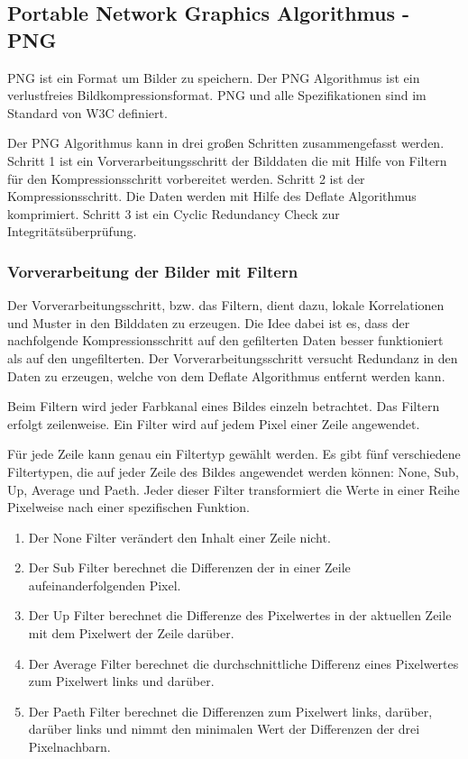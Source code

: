 \documentclass[conference]{IEEEtran}
\begin{document}
\subsection{Portable Network Graphics Algorithmus - PNG}

PNG ist ein Format um Bilder zu speichern.
Der PNG Algorithmus ist ein verlustfreies Bildkompressionsformat. 
PNG und alle Spezifikationen sind im Standard von W3C definiert. \cite{w3c}

Der PNG Algorithmus kann in drei großen Schritten zusammengefasst werden.
Schritt 1 ist ein Vorverarbeitungsschritt der Bilddaten die mit Hilfe von 
Filtern für den Kompressionsschritt vorbereitet werden.
Schritt 2 ist der Kompressionsschritt. 
Die Daten werden mit Hilfe des Deflate Algorithmus komprimiert.
Schritt 3 ist ein Cyclic Redundancy Check zur Integritätsüberprüfung.


\subsubsection{Vorverarbeitung der Bilder mit Filtern}

Der Vorverarbeitungsschritt, bzw. das Filtern, dient dazu, lokale Korrelationen und 
Muster in den Bilddaten zu erzeugen.
Die Idee dabei ist es, dass der nachfolgende Kompressionsschritt
auf den gefilterten Daten besser funktioniert als auf den ungefilterten.
Der Vorverarbeitungsschritt versucht Redundanz in den Daten zu erzeugen, welche 
von dem Deflate Algorithmus entfernt werden kann. 

Beim Filtern wird jeder Farbkanal eines Bildes einzeln betrachtet. 
Das Filtern erfolgt zeilenweise. 
Ein Filter wird auf jedem Pixel einer Zeile angewendet.

Für jede Zeile kann genau ein Filtertyp gewählt werden. 
Es gibt fünf verschiedene Filtertypen, die auf jeder Zeile 
des Bildes angewendet werden können: None, Sub, Up, Average und Paeth. 
Jeder dieser Filter transformiert die Werte in einer Reihe Pixelweise nach einer spezifischen
Funktion.

\begin{enumerate}
  \item Der None Filter verändert den Inhalt einer Zeile nicht.
  \item Der Sub Filter berechnet die Differenzen der in einer Zeile aufeinanderfolgenden Pixel.
  \item Der Up Filter berechnet die Differenze des Pixelwertes in der aktuellen Zeile mit 
  dem Pixelwert der Zeile darüber.
  \item Der Average Filter berechnet die durchschnittliche Differenz eines Pixelwertes zum 
  Pixelwert links und darüber.
  \item Der Paeth Filter berechnet die Differenzen zum Pixelwert links, darüber, darüber links und nimmt den
  minimalen Wert der Differenzen der drei Pixelnachbarn.
\end{enumerate}
\end{document}
